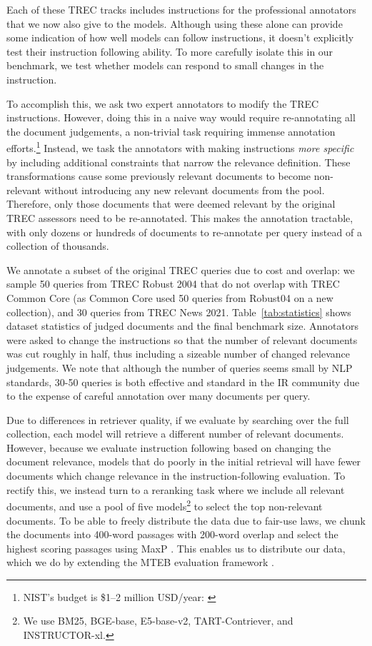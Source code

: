 \documentclass{article} %
\begin{document}
Each of these TREC tracks includes instructions for the professional annotators that we now also give to the models. Although using these alone can provide some indication of how well models can follow instructions, it doesn't explicitly test their instruction following ability. To more carefully isolate this in our benchmark, we test whether models can respond to small changes in the instruction.

To accomplish this, we ask two expert annotators to modify the TREC instructions. However, doing this in a naive way would require re-annotating all the document judgements, a non-trivial task requiring immense annotation efforts.\footnote{NIST's  budget is \$1--2 million USD/year: \href{https://trec.nist.gov/pubs/2010.economic.impact.pdf}{}} 
Instead, we task the annotators with making instructions \textit{more specific} by including additional constraints that narrow the relevance definition. 
These transformations cause some previously relevant documents to become non-relevant without introducing any new relevant documents from the pool.
Therefore, only those documents that were deemed relevant by the original TREC assessors need to be re-annotated.
This makes the annotation tractable, with only dozens or hundreds of documents to re-annotate per query instead of a collection of thousands.

We annotate a subset of the original TREC queries due to cost and overlap: we sample 50 queries from TREC Robust 2004 that do not overlap with TREC Common Core (as Common Core used 50 queries from Robust04 on a new collection), and 30 queries from TREC News 2021. Table~\ref{tab:statistics} shows dataset statistics of judged documents and the final benchmark size. 
Annotators were asked to change the instructions so that the number of relevant documents was cut roughly in half, thus including a sizeable number of changed relevance judgements.
We note that although the number of queries seems small by NLP standards, 30-50 queries is both effective \citep{webber2008statistical} and standard in the IR community due to the expense of careful annotation over many documents per query.

Due to differences in retriever quality, if we evaluate by searching over the full collection, each model will retrieve a different number of relevant documents. However, because we evaluate instruction following based on changing the document relevance, models that do poorly in the initial retrieval will have fewer documents which change relevance in the instruction-following evaluation. To rectify this, we instead turn to a reranking task where we include all relevant documents, and use a pool of five models\footnote{We use BM25, BGE-base, E5-base-v2, TART-Contriever, and INSTRUCTOR-xl.} to select the top non-relevant documents. To be able to freely distribute the data due to fair-use laws, we chunk the documents into 400-word passages with 200-word overlap and select the highest scoring passages using MaxP \citep{dai2019deeper}. This enables us to distribute our data, which we do by extending the MTEB evaluation framework \citep{muennighoff2022mteb}.
\end{document}
